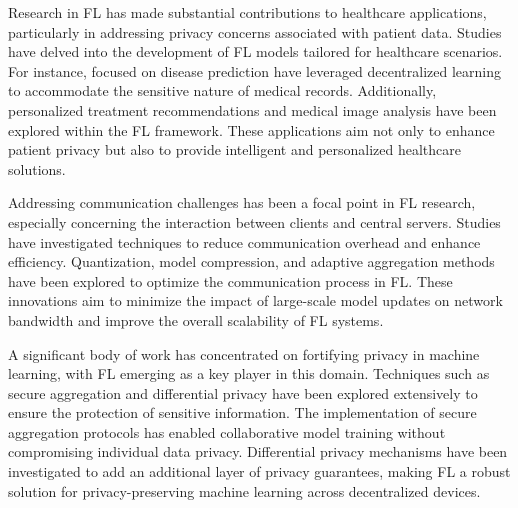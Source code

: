 \documentclass[conference]{IEEEtran}
\begin{document}

Research in FL has made substantial contributions to healthcare applications, particularly in addressing privacy concerns associated with patient data. Studies have delved into the development of FL models tailored for healthcare scenarios. For instance, focused on disease prediction have leveraged decentralized learning to accommodate the sensitive nature of medical records.\cite{5} Additionally, personalized treatment recommendations and medical image analysis have been explored within the FL framework. These applications aim not only to enhance patient privacy but also to provide intelligent and personalized healthcare solutions.


Addressing communication challenges has been a focal point in FL research, especially concerning the interaction between clients and central servers. Studies have investigated techniques to reduce communication\cite{6} overhead and enhance efficiency. Quantization, model compression, and adaptive aggregation methods have been explored to optimize the communication process in FL. These innovations aim to minimize the impact of large-scale model updates on network bandwidth and improve the overall scalability of FL systems.


A significant body of work has concentrated on fortifying privacy\cite{7} in machine learning, with FL emerging as a key player in this domain. Techniques such as secure aggregation and differential privacy have been explored extensively to ensure the protection of sensitive information. The implementation of secure aggregation protocols has enabled collaborative model training without compromising individual data privacy. Differential privacy mechanisms have been investigated to add an additional layer of privacy guarantees, making FL a robust solution for privacy-preserving machine learning across decentralized devices.
\end{document}
